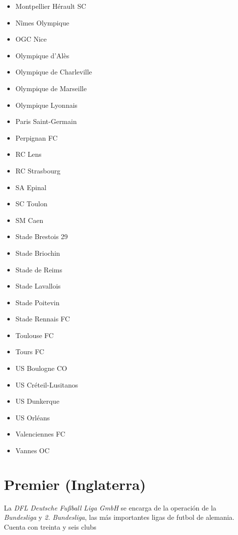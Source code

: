 \begin{multicols}{2}
\begin{itemize}
		\item Montpellier Hérault SC
		\item Nîmes Olympique
		\item OGC Nice
		\item Olympique d'Alès
		\item Olympique de Charleville
		\item Olympique de Marseille
		\item Olympique Lyonnais
		\item Paris Saint-Germain
		\item Perpignan FC
		\item RC Lens
		\item RC Strasbourg
		\item SA Epinal
		\item SC Toulon
		\item SM Caen
		\item Stade Brestois 29
		\item Stade Briochin
		\item Stade de Reims
		\item Stade Lavallois
		\item Stade Poitevin
		\item Stade Rennais FC
		\item Toulouse FC
		\item Tours FC
		\item US Boulogne CO
		\item US Créteil-Lusitanos
		\item US Dunkerque
		\item US Orléans
		\item Valenciennes FC
		\item Vannes OC
	\end{itemize}
\end{multicols}


\section{Premier (Inglaterra)}

La \emph{DFL Deutsche Fußball Liga GmbH} se encarga de la operación de la \emph{Bundesliga} y \emph{2. Bundesliga}, las más importantes ligas de futbol de alemania. Cuenta con treinta y seis clubs 

